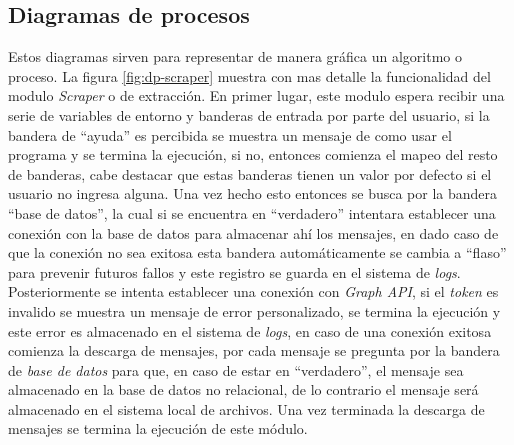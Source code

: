     \subsection{Diagramas de procesos}
    Estos diagramas sirven para representar de manera gráfica un algoritmo o proceso. La figura \ref{fig:dp-scraper} muestra con mas detalle la funcionalidad del modulo \textit{Scraper} o de extracción. En primer lugar, este modulo espera recibir una serie de variables de entorno y banderas de entrada por parte del usuario, si la bandera de ``ayuda'' es percibida se muestra un mensaje de como usar el programa y se termina la ejecución, si no, entonces comienza el mapeo del resto de banderas, cabe destacar que estas banderas tienen un valor por defecto si el usuario no ingresa alguna. Una vez hecho esto entonces se busca por la bandera ``base de datos'', la cual si se encuentra en ``verdadero'' intentara establecer una conexión con la base de datos para almacenar ahí los mensajes, en dado caso de que la conexión no sea exitosa esta bandera automáticamente se cambia a ``flaso'' para prevenir futuros fallos y este registro se guarda en el sistema de \textit{logs}. Posteriormente se intenta establecer una conexión con \textit{Graph API}, si el \textit{token} es invalido se muestra un mensaje de error personalizado, se termina la ejecución y este error es almacenado en el sistema de \textit{logs}, en caso de una conexión exitosa comienza la descarga de mensajes, por cada mensaje se pregunta por la bandera de \textit{base de datos} para que, en caso de estar en ``verdadero'', el mensaje sea almacenado en la base de datos no relacional, de lo contrario el mensaje será almacenado en el sistema local de archivos. Una vez terminada la descarga de mensajes se termina la ejecución de este módulo. \break \break
